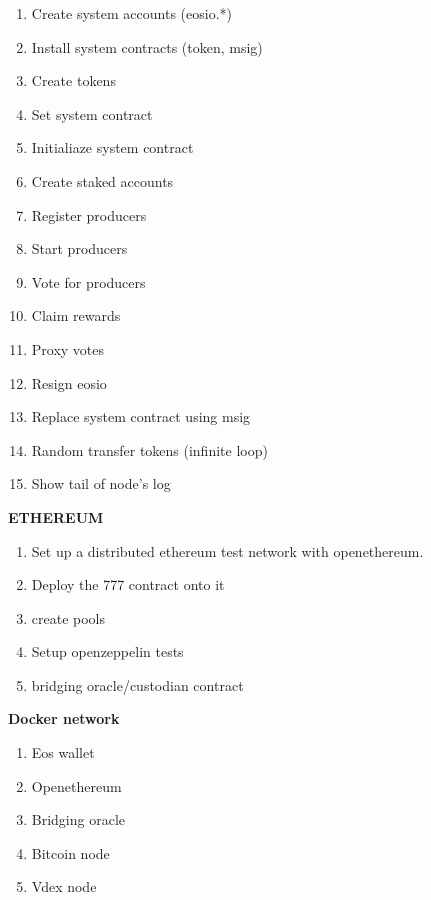 \documentclass[]{article}
\begin{document}
\begin{enumerate}
		\item Create system accounts (eosio.*)
		\item Install system contracts (token, msig)
		\item Create tokens
		\item Set system contract
		\item Initialiaze system contract
		\item Create staked accounts
		\item Register producers
		\item Start producers
		\item Vote for producers
		\item Claim rewards
		\item Proxy votes
		\item Resign eosio
		\item Replace system contract using msig
		\item Random transfer tokens (infinite loop)
		\item Show tail of node's log
   	  \end{enumerate}   
	 \textbf{ETHEREUM}
	   \begin{enumerate}
	   	\item Set up a distributed ethereum test network with openethereum. \item Deploy the 777 contract onto it
	    \item create pools 
	   	\item Setup openzeppelin tests
	   	\item bridging oracle/custodian contract
	   	\end{enumerate}       
   \textbf{Docker network}	 
\begin{enumerate}
	\item Eos wallet
	\item Openethereum
	\item Bridging oracle
	\item Bitcoin node
	\item Vdex node
\end{enumerate}   
\end{document}
